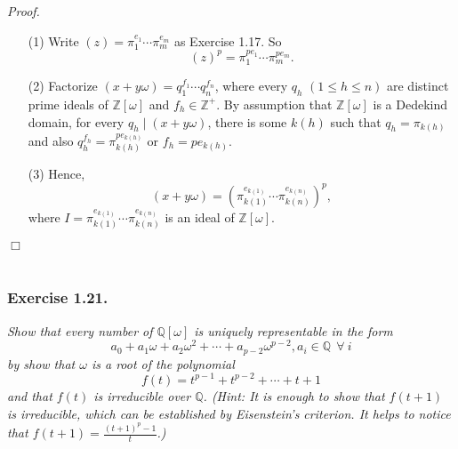 \documentclass{article}
\begin{document}
\emph{Proof.}
\begin{enumerate}
\item[(1)]
Write $(z) = {\pi}_1^{e_1} \cdots {\pi}_m^{e_m}$ as Exercise 1.17.
So
$$(z)^p = {\pi}_1^{pe_1} \cdots {\pi}_m^{pe_m}.$$
\item[(2)]
Factorize $(x + y\omega) = q_1^{f_1} \cdots q_n^{f_n}$,
where every $q_h$ $(1 \leq h \leq n)$ are distinct prime ideals of $\mathbb{Z}[\omega]$
and $f_h \in \mathbb{Z}^+$.
By assumption that $\mathbb{Z}[\omega]$ is a Dedekind domain,
for every $q_h \mid (x + y\omega)$, there is some $k(h)$ such that $q_h = \pi_{k(h)}$
and also $q_h^{f_h} = \pi_{k(h)}^{pe_{k(h)}}$ or $f_h = pe_{k(h)}$.
\item[(3)]
Hence,
$$(x + y\omega) = \left( \pi_{k(1)}^{e_{k(1)}} \cdots \pi_{k(n)}^{e_{k(n)}} \right)^p,$$
where $I = \pi_{k(1)}^{e_{k(1)}} \cdots \pi_{k(n)}^{e_{k(n)}}$
is an ideal of $\mathbb{Z}[\omega]$.
\end{enumerate}
$\Box$ \\\\






\subsubsection*{Exercise 1.21.}
\emph{Show that every number of $\mathbb{Q}[\omega]$ is uniquely representable in the form
$$a_0 + a_1\omega + a_2\omega^2 + \cdots + a_{p-2}\omega^{p-2},
a_i \in \mathbb{Q} \:\: \forall \: i$$
by show that $\omega$ is a root of the polynomial
$$f(t) = t^{p-1} + t^{p-2} + \cdots + t + 1$$
and that $f(t)$ is irreducible over $\mathbb{Q}$.
(Hint: It is enough to show that $f(t+1)$ is irreducible,
which can be established by Eisenstein's criterion.
It helps to notice that $f(t+1) = \frac{(t+1)^p-1}{t}$.) } \\
\end{document}
